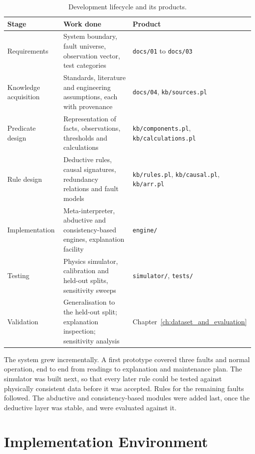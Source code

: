 \begin{table}[htbp]
  \centering
  \small
  \caption{Development lifecycle and its products.}
  \label{tab:lifecycle}
  \begin{tabular}{L{3.0cm}L{6.4cm}L{4.6cm}}
    \toprule
    Stage & Work done & Product \\
    \midrule
    Requirements & System boundary, fault universe, observation vector, test categories & \texttt{docs/01} to \texttt{docs/03} \\
    Knowledge acquisition & Standards, literature and engineering assumptions, each with provenance & \texttt{docs/04}, \texttt{kb/sources.pl} \\
    Predicate design & Representation of facts, observations, thresholds and calculations & \texttt{kb/components.pl}, \texttt{kb/calculations.pl} \\
    Rule design & Deductive rules, causal signatures, redundancy relations and fault models & \texttt{kb/rules.pl}, \texttt{kb/causal.pl}, \texttt{kb/arr.pl} \\
    Implementation & Meta-interpreter, abductive and consistency-based engines, explanation facility & \texttt{engine/} \\
    Testing & Physics simulator, calibration and held-out splits, sensitivity sweeps & \texttt{simulator/}, \texttt{tests/} \\
    Validation & Generalisation to the held-out split; explanation inspection; sensitivity analysis & Chapter~\ref{ch:dataset_and_evaluation} \\
    \bottomrule
  \end{tabular}
\end{table}

The system grew incrementally. A first prototype covered three faults and normal operation, end to end from readings to explanation and maintenance plan. The simulator was built next, so that every later rule could be tested against physically consistent data before it was accepted. Rules for the remaining faults followed. The abductive and consistency-based modules were added last, once the deductive layer was stable, and were evaluated against it.

\section{Implementation Environment}
\label{sec:environment}

